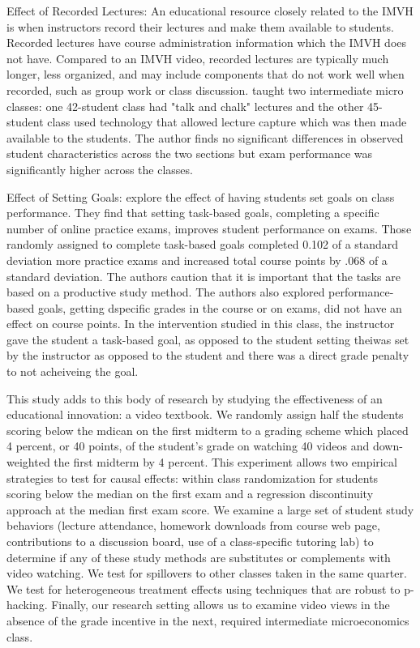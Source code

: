 \documentclass[12pt]{article}
\begin{document}
Effect of Recorded Lectures: An educational resource closely related to the IMVH is when instructors record their lectures and make them available to students. Recorded lectures have course administration information which the IMVH does not have. Compared to an IMVH video, recorded lectures are typically much longer, less organized, and may include components that do not work well when recorded, such as group work or class discussion.  \textcite{savage2009} taught two intermediate micro classes: one 42-student class had "talk and chalk" lectures and the other 45-student class used technology that allowed lecture capture which was then made available to the students. The author finds no significant differences in observed student characteristics across the two sections but exam performance was significantly higher across the classes.

Effect of Setting Goals:  \textcite{cgpr2020} explore the effect of having students set goals on class performance. They find that setting task-based goals, completing a specific number of online practice exams, improves student performance on exams. Those randomly assigned to complete task-based goals completed 0.102 of a standard deviation more practice exams and increased total course points by .068 of a standard deviation. The authors caution that it is important that the tasks are based on a productive study method. The authors also explored performance-based goals, getting dspecific grades in the course or on exams, did not have an effect on course points.  In the intervention studied in this class, the instructor gave the student a task-based goal, as opposed to the student setting theiwas set by the instructor as opposed to the student and there was a direct grade penalty to not acheiveing the goal.

This study adds to this body of research by studying the effectiveness of an educational innovation: a video textbook. We randomly assign half the students scoring below the mdican on the first midterm to a grading scheme which placed 4 percent, or 40 points, of the student's grade on watching 40 videos and down-weighted the first midterm by 4 percent.  This experiment allows two empirical strategies to test for causal effects: within class randomization for students scoring below the median on the first exam and a regression discontinuity approach at the median first exam score. We examine a large set of student study behaviors (lecture attendance, homework downloads from course web page, contributions to a discussion board, use of a class-specific tutoring lab) to determine if any of these study methods are substitutes or complements with video watching. We test for spillovers to other classes taken in the same quarter. We test for heterogeneous treatment effects using techniques that are robust to p-hacking. Finally, our research setting allows us to examine video views in the absence of the grade incentive in the next, required intermediate microeconomics class.
\end{document}
